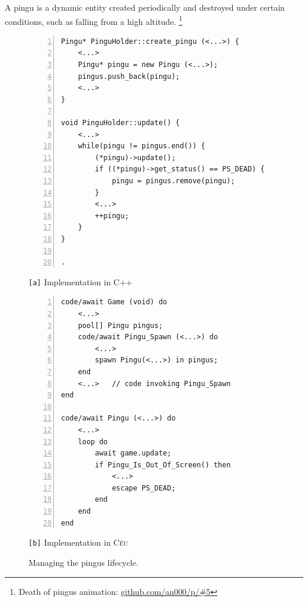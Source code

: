 \documentclass{vgtc}                          %
\newcommand{\CEU}{\textsc{C\'{e}u}\xspace}
\newcommand{\code}[1] {{\small{\texttt{#1}}}}
\newcommand{\ax}{\code{[a]}\xspace}
\newcommand{\bx}{\code{[b]}\xspace}
\begin{document}

A pingu is a dynamic entity created periodically and destroyed under certain
conditions, such as falling from a high altitude.%
\footnote{Death of pingus animation: \url{github.com/an000/p/#5} }
%

\begin{figure}[t]
\begin{minipage}[t]{0.50\linewidth}
\begin{lstlisting}[numbers=left,xleftmargin=3em]
Pingu* PinguHolder::create_pingu (<...>) {
    <...>
    Pingu* pingu = new Pingu (<...>);
    pingus.push_back(pingu);
    <...>
}

void PinguHolder::update() {
    <...>
    while(pingu != pingus.end()) {
        (*pingu)->update();
        if ((*pingu)->get_status() == PS_DEAD) {
            pingu = pingus.remove(pingu);
        }
        <...>
        ++pingu;
    }
}

.
\end{lstlisting}
\centering\small{\ax Implementation in C++}
\end{minipage}
%
\begin{minipage}[t]{0.50\linewidth}
\begin{lstlisting}[numbers=left,xleftmargin=3em]
code/await Game (void) do
    <...>
    pool[] Pingu pingus;
    code/await Pingu_Spawn (<...>) do
        <...>
        spawn Pingu(<...>) in pingus;
    end
    <...>   // code invoking Pingu_Spawn
end

code/await Pingu (<...>) do
    <...>
    loop do
        await game.update;
        if Pingu_Is_Out_Of_Screen() then
            <...>
            escape PS_DEAD;
        end
    end
end
\end{lstlisting}
\centering\small{\bx Implementation in \CEU}
\end{minipage}
\caption{ Managing the pingus lifecycle.
\label{lst.pingus}
}
\end{figure}
\end{document}
